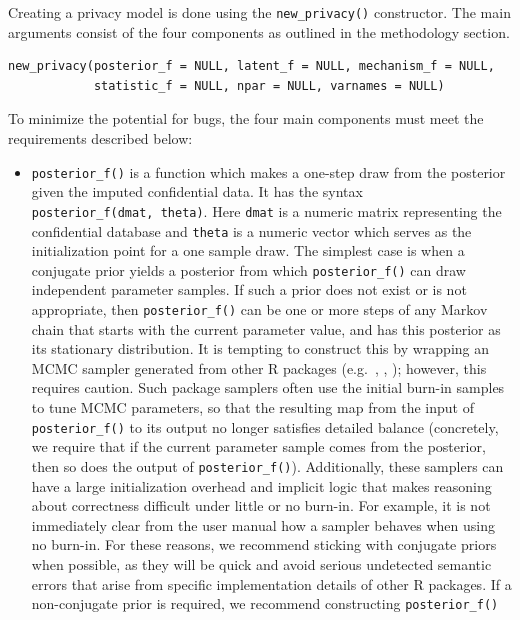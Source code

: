Creating a privacy model is done using the \texttt{new\_privacy()} constructor. The
main arguments consist of the four components as outlined in the methodology
section.

\begin{verbatim}
new_privacy(posterior_f = NULL, latent_f = NULL, mechanism_f = NULL, 
            statistic_f = NULL, npar = NULL, varnames = NULL)
\end{verbatim}

To minimize the potential for bugs, the four main components must meet the requirements described below:

\begin{itemize}
\item
  \texttt{posterior\_f()} is a function which makes a one-step draw from the posterior given the imputed confidential data. It has
  the syntax \texttt{posterior\_f(dmat,\ theta)}. Here \texttt{dmat} is a numeric matrix representing the confidential database
  and \texttt{theta} is a numeric vector which serves as the initialization point for a one sample draw.
  The simplest case is when a conjugate prior yields a posterior from which
  \texttt{posterior\_f()} can draw independent parameter samples.
  If such a prior does not exist or is not appropriate, then \texttt{posterior\_f()} can be
  one or more steps of any Markov chain that starts with the current parameter value,
  and has this posterior as its stationary distribution.
  It is tempting to construct this by wrapping an MCMC sampler generated from other
  R packages (e.g.~,  \citep{fmcmc_pkg},  \citep{adaptMCMC_pkg}); however, this requires caution.
  Such package samplers often use the initial burn-in samples to tune MCMC parameters,
  so that the resulting map from the input of \texttt{posterior\_f()} to its output no longer satisfies
  detailed balance (concretely, we require that if the current parameter sample comes
  from the posterior, then so does the output of \texttt{posterior\_f()}). Additionally,
  these samplers can have a large initialization overhead and implicit logic
  that makes reasoning about correctness difficult under little or no burn-in. For example,
  it is not immediately clear from the  user manual how a sampler behaves
  when using no burn-in. For these reasons,
  we recommend sticking with conjugate priors when possible, as they will be quick and avoid
  serious undetected semantic errors that arise from specific implementation details of other R packages.
  If a non-conjugate prior is required, we recommend constructing \texttt{posterior\_f()}

\end{itemize}

